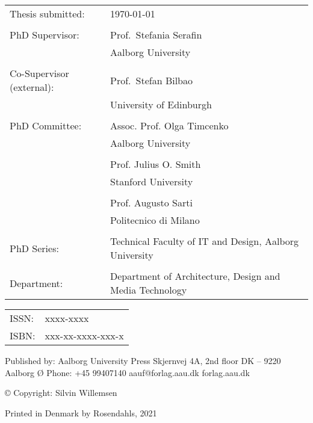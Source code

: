 \thispagestyle{empty}
\noindent
\begin{tabularx}{\textwidth}{@{}lX}
    Thesis submitted: & \today\\
    \\
    PhD Supervisor: & Prof.\ Stefania Serafin\\
                    & Aalborg University\\
                    \\
    Co-Supervisor (external): & Prof.\ Stefan Bilbao\\
                    & University of Edinburgh\\
                    \\
    PhD Committee:  & Assoc. Prof. Olga Timcenko\\
                    & Aalborg University\\
                    \\
                    & Prof. Julius O. Smith \\
                    & Stanford University\\
                    \\
                    & Prof. Augusto Sarti\\
                    & Politecnico di Milano\\
                   \\
    PhD Series:    & Technical Faculty of IT and Design, Aalborg University\\
    \\
    Department: & Department of Architecture, Design and Media Technology
\end{tabularx}
\strut\vfill
\noindent
\begin{tabularx}{\textwidth}{@{}lX}
    ISSN: & xxxx-xxxx\\
    ISBN: & xxx-xx-xxxx-xxx-x\\
\end{tabularx}
\strut\vfill
\noindent Published by:\newline
Aalborg University Press\newline
Skjernvej 4A, 2nd floor\newline
DK – 9220 Aalborg Ø\newline
Phone: +45 99407140\newline
aauf@forlag.aau.dk\newline
forlag.aau.dk
\strut\vfill
\noindent \copyright{} Copyright: Silvin Willemsen\newline
\strut\vfill
\noindent Printed in Denmark by Rosendahls, 2021
\clearpage

